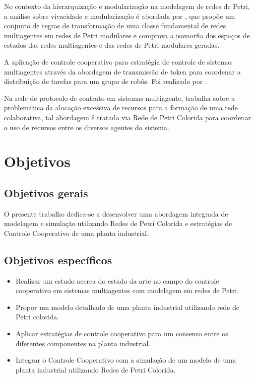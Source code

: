 No contexto da hierarquização e modularização na modelagem de redes de Petri, a análise sobre vivacidade e modularização é abordada por \cite{modular2013}, que propõe um conjunto de regras de transformação de uma classe fundamental de redes multiagentes em redes de Petri modulares e comprova a isomorfia dos espaços de estados das redes multiagentes e das redes de Petri modulares geradas.

A aplicação de controle cooperativo para estratégia de controle de sistemas multiagentes através da abordagem de transmissão de token para coordenar a distribuição de tarefas para um grupo de robôs. Foi realizado por  \cite{token2006}.

Na rede de protocolo de contrato em sistemas multiagente, \cite{contract2009} trabalha sobre a problemática da alocação excessiva de recursos para a formação de uma rede colaborativa, tal abordagem é tratada via Rede de Petri Colorida para coordenar o uso de recursos entre os diversos agentes do sistema.


\section{Objetivos}
\subsection{Objetivos gerais}
 O presente trabalho dedica-se a desenvolver uma abordagem integrada de modelagem e simulação utilizando Redes de Petri Colorida e estratégias de Controle Cooperativo de uma planta industrial.

\subsection{Objetivos específicos}
\begin{itemize}[]
    \item {Realizar um estudo acerca do estado da arte no campo do controle cooperativo em sistemas multiagentes com modelagem em redes de Petri.}
    
    \item {Propor um modelo detalhado de uma planta industrial utilizando rede de Petri colorida.}
    
    \item {Aplicar estratégias de controle cooperativo para um consenso entre os diferentes componentes na planta industrial.}

    \item {Integrar  o  Controle Cooperativo com a  simulação de um modelo de uma planta industrial utilizando Redes de Petri Colorida.} 
\end{itemize}


